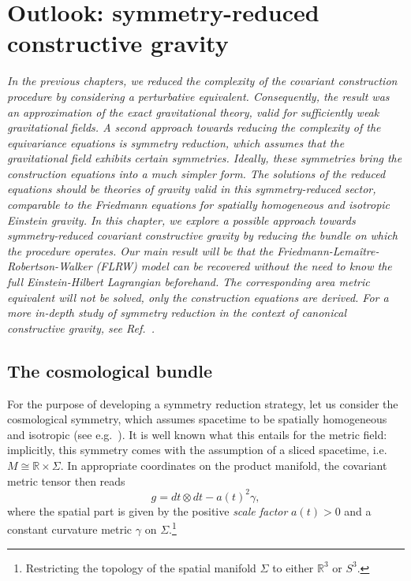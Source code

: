 \chapter{Outlook: symmetry-reduced constructive gravity}\label{chapter_cosmo}

\textit{In the previous chapters, we reduced the complexity of the covariant construction procedure by considering a perturbative equivalent. Consequently, the result was an approximation of the exact gravitational theory, valid for sufficiently weak gravitational fields. A second approach towards reducing the complexity of the equivariance equations is symmetry reduction, which assumes that the gravitational field exhibits certain symmetries. Ideally, these symmetries bring the construction equations into a much simpler form. The solutions of the reduced equations should be theories of gravity valid in this symmetry-reduced sector, comparable to the Friedmann equations for spatially homogeneous and isotropic Einstein gravity. In this chapter, we explore a possible approach towards symmetry-reduced covariant constructive gravity by reducing the bundle on which the procedure operates. Our main result will be that the Friedmann-Lema\^itre-Robertson-Walker (FLRW) model can be recovered without the need to know the full Einstein-Hilbert Lagrangian beforehand. The corresponding area metric equivalent will not be solved, only the construction equations are derived. For a more in-depth study of symmetry reduction in the context of canonical constructive gravity, see Ref.\ \cite{Duell_2020}.}

\section{The cosmological bundle}
For the purpose of developing a symmetry reduction strategy, let us consider the cosmological symmetry, which assumes spacetime to be spatially homogeneous and isotropic (see e.g.\ \cite{Weinberg_1972,Wald_1984}). It is well known what this entails for the metric field: implicitly, this symmetry comes with the assumption of a sliced spacetime, i.e.\ $M \cong \mathbb R \times \Sigma$. In appropriate coordinates on the product manifold, the covariant metric tensor then reads \cite{Weinberg_1972,Katanaev_2016}
\begin{equation}
  g = dt \otimes dt - a(t)^2 \gamma,
\end{equation}
where the spatial part is given by the positive \emph{scale factor} $a(t) > 0$ and a constant curvature metric $\gamma$ on $\Sigma$.\footnote{Restricting the topology of the spatial manifold $\Sigma$ to either $\mathbb R^3$ or $S^3$.}


